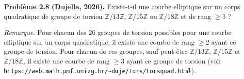\textbf{Problème 2.8 (Dujella, 2026).} Existe-t-il une courbe elliptique sur un corps quadratique de groupe de torsion $\mathbb{Z}/13\mathbb{Z}$, $\mathbb{Z}/15\mathbb{Z}$ ou $\mathbb{Z}/18\mathbb{Z}$ et de rang $\geqslant 3$ ?

\medskip

\textit{Remarque.} Pour chacun des 26 groupes de torsion possibles pour une courbe elliptique sur un corps quadratique, il existe une courbe de rang $\geqslant 2$ ayant ce groupe de torsion. Pour chacun de ces groupes, sauf peut-être $\mathbb{Z}/13\mathbb{Z}$, $\mathbb{Z}/15\mathbb{Z}$ et $\mathbb{Z}/18\mathbb{Z}$, il existe une courbe de rang $\geqslant 3$ ayant ce groupe de torsion (voir \texttt{https://web.math.pmf.unizg.hr/\textasciitilde duje/tors/torsquad.html}).
